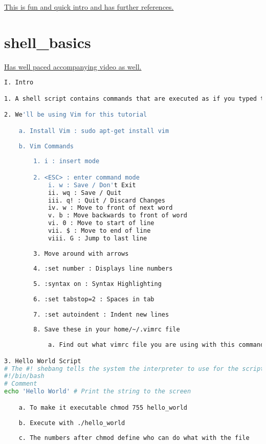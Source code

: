 \href{https://codepen.io/jakealbaugh/post/regex-in-sublime-text}{This is fun and quick intro and has further references.}



\section{shell_basics}


\href{http://www.newthinktank.com/2016/06/shell-scripting-tutorial/}{Has well paced accompanying video as well.}



\begin{lstlisting}[language=bash,caption={basics of bash}]
I. Intro

1. A shell script contains commands that are executed as if you typed them in the terminal.

2. We'll be using Vim for this tutorial

	a. Install Vim : sudo apt-get install vim
	
	b. Vim Commands
	
		1. i : insert mode

		2. <ESC> : enter command mode
			i. w : Save / Don't Exit
			ii. wq : Save / Quit
			iii. q! : Quit / Discard Changes
			iv. w : Move to front of next word
			v. b : Move backwards to front of word
			vi. 0 : Move to start of line
			vii. $ : Move to end of line
			viii. G : Jump to last line
		
		3. Move around with arrows
		
		4. :set number : Displays line numbers
		
		5. :syntax on : Syntax Highlighting
		
		6. :set tabstop=2 : Spaces in tab
		
		7. :set autoindent : Indent new lines
		
		8. Save these in your home/~/.vimrc file
		
			a. Find out what vimrc file you are using with this command in Vim :echo $MYVIMRC

3. Hello World Script
# The #! shebang tells the system the interpreter to use for the script
#!/bin/bash
# Comment
echo 'Hello World' # Print the string to the screen

	a. To make it executable chmod 755 hello_world
	
	b. Execute with ./hello_world
	
	c. The numbers after chmod define who can do what with the file
	

\end{lstlisting}
